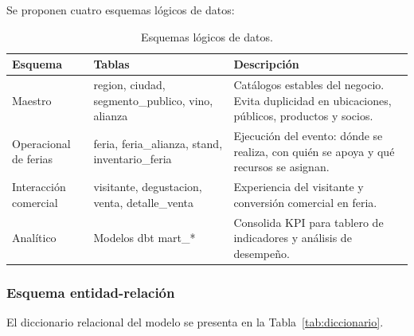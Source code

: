 \documentclass[10pt,a4paper]{article}
\begin{document}
Se proponen cuatro esquemas l\'ogicos de datos:

\begin{table}[H]
\centering
\caption{Esquemas l\'ogicos de datos.}
\label{tab:esquemas}
\small
\begin{tabular}{p{2.5cm} p{4.5cm} p{6.5cm}}
\toprule
\textbf{Esquema} & \textbf{Tablas} & \textbf{Descripci\'on} \\
\midrule
Maestro & region, ciudad, segmento\_publico, vino, alianza & Cat\'alogos estables del negocio. Evita duplicidad en ubicaciones, p\'ublicos, productos y socios. \\
Operacional de ferias & feria, feria\_alianza, stand, inventario\_feria & Ejecuci\'on del evento: d\'onde se realiza, con qui\'en se apoya y qu\'e recursos se asignan. \\
Interacci\'on comercial & visitante, degustacion, venta, detalle\_venta & Experiencia del visitante y conversi\'on comercial en feria. \\
Anal\'itico & Modelos dbt mart\_* & Consolida KPI para tablero de indicadores y an\'alisis de desempe\~no. \\
\bottomrule
\end{tabular}
\end{table}

\subsubsection{Esquema entidad-relaci\'on}


El diccionario relacional del modelo se presenta en la Tabla~\ref{tab:diccionario}.
\end{document}
